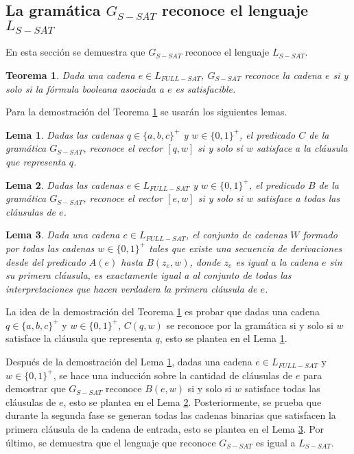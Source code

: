 \documentclass{article}
\newtheorem{theorem}{Teorema}
\newtheorem{lemma}{Lema}
\begin{document}
\subsection{La gramática $G_{S-SAT}$ reconoce el lenguaje $L_{S-SAT}$}

En esta sección se demuestra que $G_{S-SAT}$ reconoce el lenguaje $L_{S-SAT}$.
\begin{theorem}
    \label{teo:gsat}
    Dada una cadena $e\in L_{FULL-SAT}$, $G_{S-SAT}$ reconoce la cadena $e$ si y solo si la fórmula booleana asociada a $e$ es satisfacible.
\end{theorem}

Para la demostración del Teorema \ref{teo:gsat} se usarán los siguientes lemas.

\begin{lemma}
    \label{lem:predc}
    Dadas las cadenas $q\in \{a,b,c\}^+$ y $w\in \{0,1\}^+$, el predicado $C$ de la gramática $G_{S-SAT}$, reconoce el vector $[q,w]$ si y solo si $w$ satisface a la cláusula que representa $q$.
\end{lemma}

\begin{lemma}
    \label{lem:predb}
    Dadas las cadenas $e\in L_{FULL-SAT}$ y $w\in \{0,1\}^+$, el predicado $B$ de la gramática $G_{S-SAT}$, reconoce el vector $[e,w]$  si y solo si $w$ satisface a todas las cláusulas de $e$.
\end{lemma}

\begin{lemma}
    \label{lem:preda}
    Dada una cadena $e\in L_{FULL-SAT}$, el conjunto de cadenas $W$ formado por todas las cadenas
    $w\in \{0,1\}^+$ tales que existe una secuencia de derivaciones desde del predicado $A(e)$ hasta
    $B(z_e,w)$, donde $z_e$ es igual a la cadena $e$ sin su primera cláusula, es exactamente igual a
    al conjunto de todas las interpretaciones que hacen verdadera la primera cláusula de $e$.
\end{lemma}

La idea de la demostración del Teorema \ref{teo:gsat} es probar que dadas una cadena $q\in \{a,b,c\}^+$ y
$w\in \{0,1\}^+$, $C(q,w)$ se reconoce por la gramática si y solo si $w$ satisface la cláusula que
representa $q$, esto se plantea en el Lema \ref{lem:predc}.

Después de la demostración del Lema \ref{lem:predc}, dadas una cadena $e\in L_{FULL-SAT}$ y $w\in \{0,1\}^+$, se hace una inducción sobre la cantidad de cláusulas de $e$ para demostrar que $G_{S-SAT}$ reconoce $B(e,w)$ si y solo si $w$ satisface todas las cláusulas de $e$, esto se plantea en el Lema \ref{lem:predb}. Posteriormente, se prueba que durante la segunda fase se generan todas las cadenas binarias que satisfacen la primera cláusula de la cadena de entrada, esto se plantea en el Lema \ref{lem:preda}. Por último, se demuestra que el lenguaje que reconoce $G_{S-SAT}$ es igual a $L_{S-SAT}$.
\end{document}
